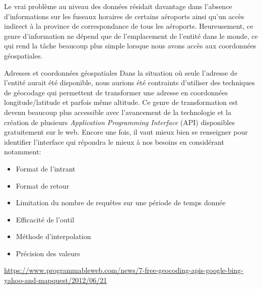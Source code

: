 Le vrai problème au niveau des données résidait davantage dans l'absence d'informations sur les fuseaux horaires de certains aéroports ainsi qu'un accès indirect à la province de correspondance de tous les aéroports. Heureusement, ce genre d'information ne dépend que de l'emplacement de l'entité dans le monde, ce qui rend la tâche beaucoup plus simple lorsque nous avons accès aux coordonnées géospatiales. \\

\begin{moreInfo}{Adresses et coordonnées géospatiales}
	Dans la situation où seule l'adresse de l'entité aurait été disponible, nous aurions été contraints d'utiliser des techniques de géocodage qui permettent de transformer une adresse en coordonnées longitude/latitude et parfois même altitude. Ce genre de transformation est devenu beaucoup plus accessible avec l'avancement de la technologie et la création de plusieurs \emph{Application Programming Interface} (API) disponibles gratuitement sur le web. Encore une fois, il vaut mieux bien se renseigner pour identifier l'interface qui répondra le mieux à nos besoins en considérant notamment:
	\begin{itemize}
		\item Format de l'intrant
		\item Format de retour
		\item Limitation du nombre de requêtes sur une période de temps donnée
		\item Efficacité de l'outil
		\item Méthode d'interpolation
		\item Précision des valeurs
	\end{itemize}
	\url{https://www.programmableweb.com/news/7-free-geocoding-apis-google-bing-yahoo-and-mapquest/2012/06/21}
\end{moreInfo}

